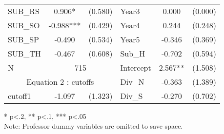 \begin{table}[htb]
\begin{threeparttable}
\begin{tabular}{l c c|l c c}
    SUB\_RS                                      & 0.906*                    & (0.580)              & Year3               & 0.000                  & (0.000)              \\
    SUB\_SO                                      & -0.988***                 & (0.429)              & Year4               & 0.244                  & (0.248)              \\
    SUB\_SP                                      & -0.490                    & (0.534)              & Year5               & -0.346                 & (0.369)              \\
    SUB\_TH                                      & -0.467                    & (0.608)              & Sub\_H              & -0.702                 & (0.594)              \\
    \cline{1-3}
      N                                          & \multicolumn{2}{|c|}{715} & Intercept            & 2.567**             & (1.508)                                       \\
    \cline{1-3}
    \multicolumn{3}{c|}{Equation 2 : cutoffs}                                                     & Div\_N & -0.363                 & (1.389)                             \\
    \cline{1-3}
    cutoff1                                      & -1.097                    & (1.323)              & Div\_S              & -0.270                 & (0.702)              \\
    \hline 
    \hline
  \end{tabular}
  \begin{tablenotes}
  \item{* p<.2, ** p<.1, *** p<.05 \\ Note: Professor dummy variables are omitted to save space.}
  \end{tablenotes}
  \centering\thepage
  \end{threeparttable}
\end{table}

\clearpage{}

\newpage{}

